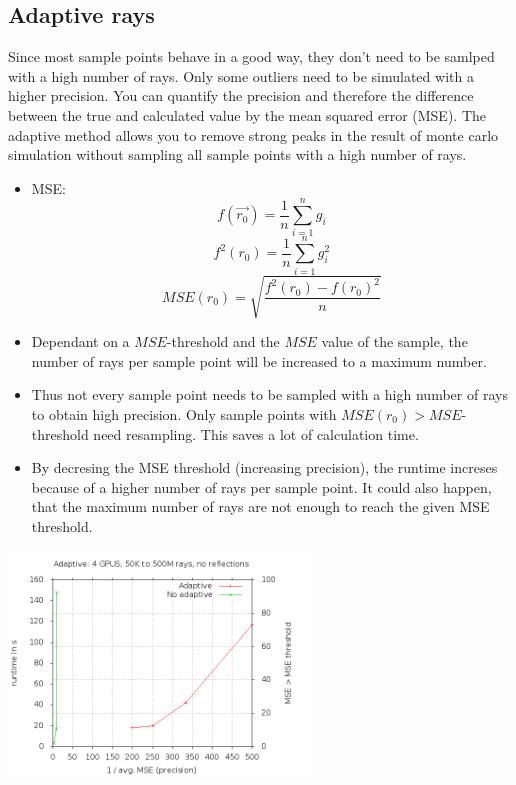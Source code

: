 \subsection{Adaptive rays}
Since most sample points behave in a good way, they don't need
to be samlped with a high number of rays. Only some outliers need to
be simulated with a higher precision. You can quantify the precision
and therefore the difference between the true and calculated value by
the mean squared error (MSE).
The adaptive method allows you to remove strong peaks in the result
of monte carlo simulation without sampling all sample points with
a high number of rays.
\begin{itemize}
\item MSE: 
     \[f(\vec{r_0}) = \frac{1}{n} \sum_{i=1}^n g_i \]
     \[f^2(r_0) = \frac{1}{n} \sum_{i=1}^n g_i^2 \]
     \[MSE(r_0) = \sqrt{\frac{f^2(r_0) - f(r_0)^2}{n}}\]
\item Dependant on a $MSE$-threshold and the $MSE$ value
  of the sample, the number of rays per sample point 
  will be increased to a maximum number.
\item Thus not every sample point needs to be sampled
  with a high number of rays to obtain high precision.
  Only sample points with $MSE(r_0) > MSE$-threshold need
  resampling. This saves a lot of calculation time.
\item By decresing the MSE threshold (increasing precision), the runtime increses because
  of a higher number of rays per sample point. It could also happen, that the maximum number
  of rays are not enough to reach the given MSE threshold.
\end{itemize}
\begin{center}
  \includegraphics[width=8cm]{plot/adaptive.png}
\end{center}
